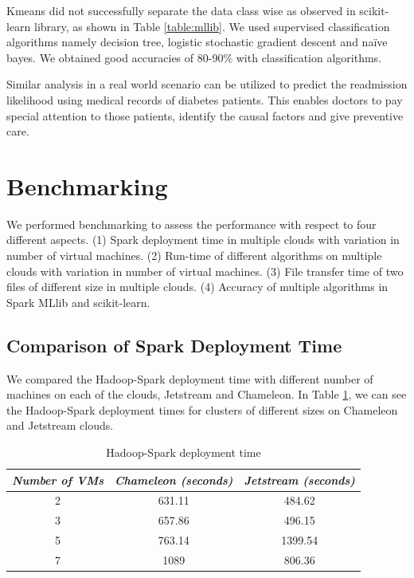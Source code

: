 \documentclass[9pt,twocolumn,twoside]{styles/osajnl}
\begin{document}
Kmeans did not successfully separate the data class wise as observed in scikit-learn library, as shown in Table \ref{table:mllib}.  We used  supervised classification algorithms namely decision tree, logistic stochastic gradient descent and naïve bayes. We obtained good accuracies of 80-90$\%$ with classification algorithms.

Similar analysis in a real world scenario can be utilized to predict the readmission likelihood using medical records of diabetes patients. This enables doctors to  pay special attention to those patients, identify the causal factors and give preventive care.



\section{Benchmarking}
 We performed benchmarking to assess the performance with respect to four different aspects. (1) Spark deployment time in multiple clouds with variation in number of virtual machines. (2) Run-time of different algorithms on multiple clouds with variation in number of virtual machines. (3) File transfer time of two files of different size in multiple clouds.
 (4) Accuracy of multiple algorithms in Spark MLlib and scikit-learn.

\subsection{Comparison of Spark Deployment Time}

We compared the Hadoop-Spark deployment time with different number of machines on each of the clouds, Jetstream and Chameleon. In Table \ref{table:finalspdeployment}, we can see  the Hadoop-Spark deployment times for clusters of different sizes on Chameleon and Jetstream clouds.

\begin{table}[h!]
\centering
\caption{Hadoop-Spark deployment time}
 \begin{tabular}{|c|c c|} 
 \hline
 \textit{Number of VMs}  & \textit{Chameleon (seconds)} & \textit{Jetstream (seconds)}\\
 \hline
 \hline 
2 & 631.11 & 484.62\\
3 & 657.86 & 496.15\\
5 & 763.14 & 1399.54\\
7 & 1089 & 806.36\\
\hline 
\end{tabular}
\label{table:finalspdeployment}
\end{table}
\end{document}
